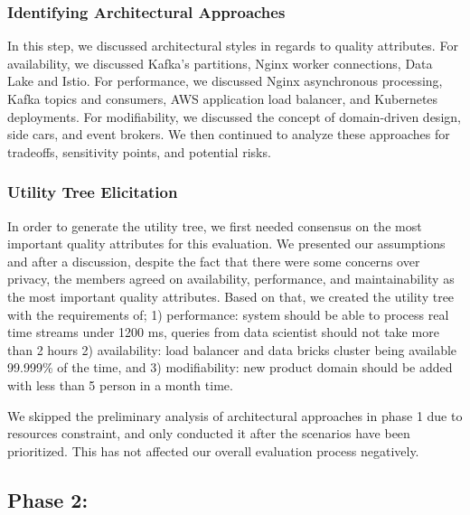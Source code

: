 \documentclass[conference]{IEEEtran}
\begin{document}
\subsubsection{Identifying Architectural Approaches}



In this step, we discussed architectural styles in regards to quality attributes. For availability, we discussed Kafka's partitions, Nginx worker connections, Data Lake and Istio.  For performance, we discussed Nginx asynchronous processing, Kafka topics and consumers, AWS application load balancer, and Kubernetes deployments. For modifiability, we discussed the concept of domain-driven design, side cars, and event brokers. We then continued to analyze these approaches for tradeoffs, sensitivity points, and potential risks. 


\subsubsection{Utility Tree Elicitation}

In order to generate the utility tree, we first needed consensus on the most important quality attributes for this evaluation. We presented our assumptions and after a discussion, despite the fact that there were some concerns over privacy, the members agreed on availability, performance, and maintainability as the most important quality attributes. Based on that, we created the utility tree with the requirements of; 1) performance: system should be able to process real time streams under 1200 ms, queries from data scientist should not take more than 2 hours 2) availability: load balancer and data bricks cluster being available 99.999\% of the time, and 3) modifiability: new product domain should be added with less than 5 person in a month time.

We skipped the preliminary analysis of architectural approaches in phase 1 due to resources constraint, and only conducted it after the scenarios have been prioritized. This has not affected our overall evaluation process negatively.



\subsection{Phase 2:}

\end{document}

